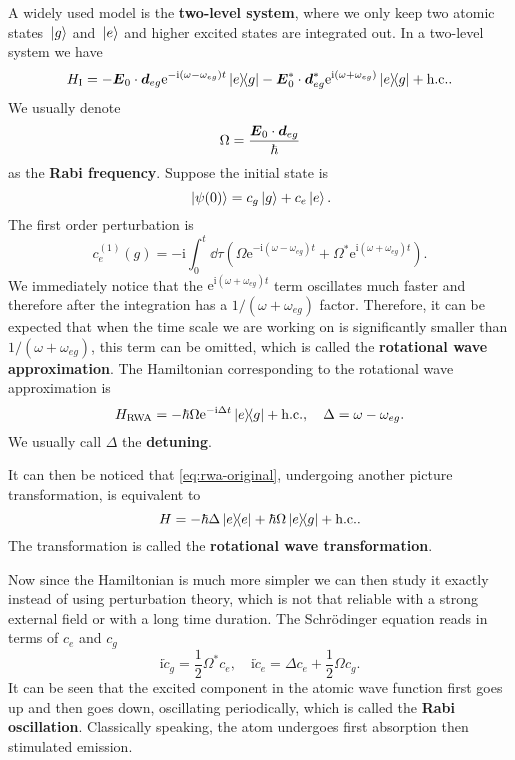 \documentclass[hyperref, a4paper]{article}
\newcommand*{\ii}{\mathrm{i}}
\newcommand*{\ee}{\mathrm{e}}
\newcommand*{\concept}[1]{{\textbf{#1}}}
\begin{document}
A widely used model is the \concept{two-level system}, where we only keep two atomic states $\ket*{g}$ and $\ket*{e}$ and higher excited states are integrated out.
In a two-level system we have 
\begin{equation}
    H_\text{I} = - \vb*{E}_0 \cdot \vb*{d}_{eg} \ee^{- \ii (\omega - \omega_{eg}) t} \dyad{e}{g} - \vb*{E}_0^* \cdot \vb*{d}^*_{{eg}} \ee^{\ii (\omega + \omega_{eg})} \dyad{e}{g} + \text{h.c.}.
\end{equation}
We usually denote 
\begin{equation}
    \Omega = \frac{\vb*{E}_0 \cdot \vb*{d}_{eg}}{\hbar}
\end{equation}
as the \concept{Rabi frequency}.
Suppose the initial state is 
\begin{equation}
    \ket*{\psi(0)} = c_{g} \ket*{g} + c_{e} \ket*{e}.
\end{equation}
The first order perturbation is 
\begin{equation}
    c^{(1)}_e(g) = - \ii \int_0^t \dd{\tau} (\Omega \ee^{- \ii (\omega - \omega_{eg}) t} + \Omega^* \ee^{\ii (\omega + \omega_{eg}) t}).
\end{equation}
We immediately notice that the $\ee^{\ii (\omega + \omega_{eg}) t}$ term oscillates much faster and therefore after the integration has a $1 / (\omega + \omega_{eg})$ factor.
Therefore, it can be expected that when the time scale we are working on is significantly smaller than $1 / (\omega + \omega_{eg})$, this term can be omitted, which is called the \concept{rotational wave approximation}.
The Hamiltonian corresponding to the rotational wave approximation is 
\begin{equation}
    H_\text{RWA} = - \hbar \Omega \ee^{- \ii \Delta t} \dyad{e}{g} + \text{h.c.}, \quad \Delta = \omega - \omega_{eg}.
    \label{eq:rwa-original}
\end{equation}
We usually call $\Delta$ the \concept{detuning}.

It can then be noticed that \eqref{eq:rwa-original}, undergoing another picture transformation, is equivalent to 
\begin{equation}
    H = - \hbar \Delta \dyad{e} + \hbar \Omega \dyad{e}{g} + \text{h.c.}.
\end{equation}
The transformation is called the \concept{rotational wave transformation}.

Now since the Hamiltonian is much more simpler we can then study it exactly instead of using perturbation theory, 
which is not that reliable with a strong external field or with a long time duration.
The Schrödinger equation reads in terms of $c_e$ and $c_g$
\begin{equation}
    \ii \dot{c}_g = \frac{1}{2} \Omega^* c_e, \quad \ii \dot{c}_e = \Delta c_e + \frac{1}{2} \Omega c_g.
\end{equation}
It can be seen that the excited component in the atomic wave function first goes up and then goes down, oscillating periodically,
which is called the \concept{Rabi oscillation}. 
Classically speaking, the atom undergoes first absorption then stimulated emission.
\end{document}
